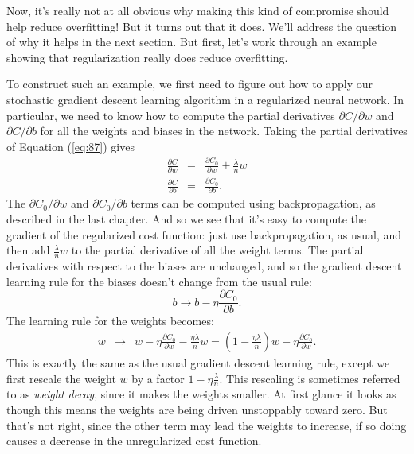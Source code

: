 \documentclass[a4paper,twoside,10pt]{book}
\begin{document}
Now, it's really not at all obvious why making this kind of compromise should help reduce overfitting! But it turns out that it does. We'll address the question of why it helps in the next section. But first, let's work through an example showing that regularization really does reduce overfitting.

To construct such an example, we first need to figure out how to apply our stochastic gradient descent learning algorithm in a regularized neural network. In particular, we need to know how to compute the partial derivatives $\partial{}C/\partial{}w$ and $\partial{}C/\partial{}b$ for all the weights and biases in the network. Taking the partial derivatives of Equation (\ref{eq:87}) gives
\begin{eqnarray} 
\frac{\partial C}{\partial w} & = & \frac{\partial C_0}{\partial w} + \frac{\lambda}{n} w \label{eq:88}\\ 
\frac{\partial C}{\partial b} & = & \frac{\partial C_0}{\partial b}. \label{eq:89}\end{eqnarray}
The $\partial{}C_0/\partial{}w$ and $\partial{}C_0/\partial{}b$ terms can be computed using backpropagation, as described in the last chapter. And so we see that it's easy to compute the gradient of the regularized cost function: just use backpropagation, as usual, and then add $\frac{\lambda}{n}w$ to the partial derivative of all the weight terms. The partial derivatives with respect to the biases are unchanged, and so the gradient descent learning rule for the biases doesn't change from the usual rule:
\begin{equation}
b\to b-\eta\frac{\partial{}C_0}{\partial{}b}.
\label{eq:90}
\end{equation}
The learning rule for the weights becomes:
\begin{eqnarray} 
w & \rightarrow & w-\eta \frac{\partial C_0}{\partial w}-\frac{\eta \lambda}{n} w  = \left(1-\frac{\eta \lambda}{n}\right) w -\eta \frac{\partial	C_0}{\partial w}. 
\label{eq:92}
\end{eqnarray}
This is exactly the same as the usual gradient descent learning rule, except we first rescale the weight $w$ by a factor $1-\eta\frac{\lambda}{n}$. This rescaling is sometimes referred to as \textit{weight decay}, since it makes the weights smaller. At first glance it looks as though this means the weights are being driven unstoppably toward zero. But that's not right, since the other term may lead the weights to increase, if so doing causes a decrease in the unregularized cost function.
\end{document}
